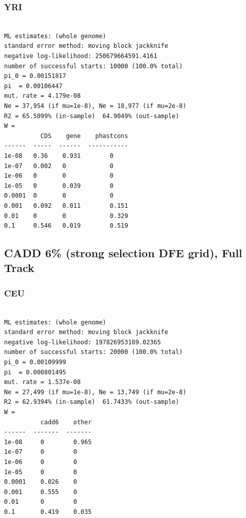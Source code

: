 \documentclass[11pt]{article}
\begin{document}
\subsubsection*{YRI}
\begin{minipage}{\linewidth}\begin{footnotesize}
\begin{verbatim}

ML estimates: (whole genome)
standard error method: moving block jackknife
negative log-likelihood: 250679664591.4161
number of successful starts: 10000 (100.0% total)
pi_0 = 0.00151817
pi  = 0.00106447
mut. rate = 4.179e-08 
Ne = 37,954 (if mu=1e-8), Ne = 18,977 (if mu=2e-8)
R2 = 65.5099% (in-sample)  64.9049% (out-sample)
W = 
          CDS    gene    phastcons
------  -----  ------  -----------
1e-08   0.36    0.931        0
1e-07   0.002   0            0
1e-06   0       0            0
1e-05   0       0.039        0
0.0001  0       0            0
0.001   0.092   0.011        0.151
0.01    0       0            0.329
0.1     0.546   0.019        0.519
\end{verbatim}
\end{footnotesize}\end{minipage}


\subsection{CADD 6\% (strong selection DFE grid), Full Track}
\subsubsection*{CEU}
\begin{minipage}{\linewidth}\begin{footnotesize}
\begin{verbatim}

ML estimates: (whole genome)
standard error method: moving block jackknife
negative log-likelihood: 197826953189.02365
number of successful starts: 20000 (100.0% total)
pi_0 = 0.00109999
pi  = 0.000801495
mut. rate = 1.537e-08 
Ne = 27,499 (if mu=1e-8), Ne = 13,749 (if mu=2e-8)
R2 = 62.9394% (in-sample)  61.7433% (out-sample)
W = 
          cadd6    other
------  -------  -------
1e-08     0        0.965
1e-07     0        0
1e-06     0        0
1e-05     0        0
0.0001    0.026    0
0.001     0.555    0
0.01      0        0
0.1       0.419    0.035
\end{verbatim}
\end{footnotesize}\end{minipage}
\end{document}
